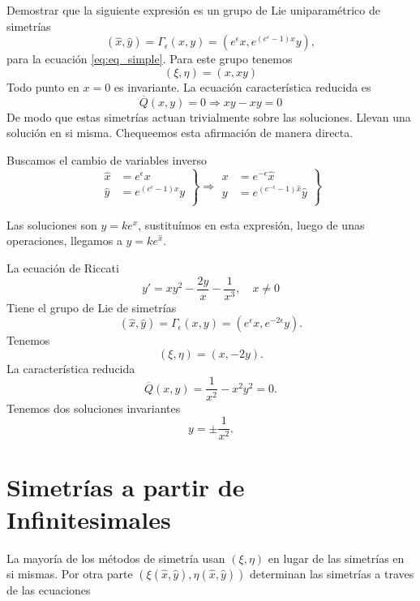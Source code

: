 \begin{ejemplo}{} Demostrar que la siguiente expresión es un grupo de Lie uniparamétrico de simetrías
\[(\hat{x},\hat{y})=\Gamma_{\epsilon}(x,y)=(e^{\epsilon}x,e^{(e^{\epsilon}-1)x}y),\]
para la ecuación \eqref{eq:eq_simple}.
Para este grupo tenemos
\[(\xi,\eta)=(x,xy)\]
Todo punto en $x=0$ es invariante. La ecuación característica reducida es
\[\overline{Q}(x,y)=0\Rightarrow xy-xy=0\]
De modo que estas simetrías actuan trivialmente sobre las soluciones. Llevan una solución en si misma. Chequeemos esta afirmación de manera directa. 
\end{ejemplo}

Buscamos el cambio de variables inverso
\[
\left.
\begin{array}{ll} 
  \hat{x}&= e^{\epsilon}x\\
  \hat{y}&=e^{(e^{\epsilon}-1)x}y\\
\end{array}
\right\} 
\Rightarrow  
    \left.
\begin{array}{ll} 
  x&= e^{-\epsilon}\hat{x}\\
  y&=e^{(e^{-\epsilon}-1)\hat{x}}\hat{y}\\
\end{array}
\right\} 
\]    

Las soluciones son $y=ke^x$, sustituímos en esta expresión, luego de unas operaciones, llegamos a $\hat{y}=ke^{\hat{x}}$.

\begin{ejemplo}{} La ecuación de Riccati
\[y'=xy^2-\frac{2y}{x}-\frac{1}{x^3},\quad x\neq 0\] 
 Tiene el grupo de Lie de simetrías
\[(\hat{x},\hat{y})=\Gamma_{\epsilon}(x,y)=(e^{\epsilon}x,e^{-2\epsilon}y).\]
Tenemos
\[(\xi,\eta)=(x,-2y).\]
La característica reducida
\[\overline{Q}(x,y)=\frac{1}{x^2}-x^2y^2=0.\]
Tenemos dos soluciones invariantes
\[y=\pm\frac{1}{x^2}.\] 

\end{ejemplo}

\section{Simetrías a partir de Infinitesimales }

 La mayoría de los métodos de simetría usan  $(\xi,\eta)$ en lugar de las simetrías en si mismas.
Por otra parte  $(\xi(\hat{x},\hat{y}),\eta(\hat{x},\hat{y}))$ determinan las simetrías a traves de las ecuaciones

